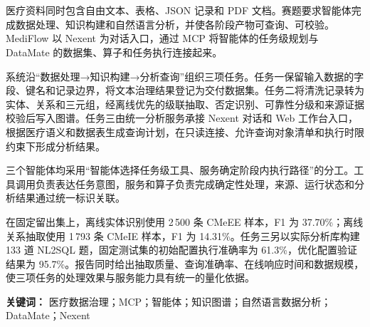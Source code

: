 \chapter*{}

医疗资料同时包含自由文本、表格、JSON 记录和 PDF 文档。赛题要求智能体完成数据处理、知识构建和自然语言分析，并使各阶段产物可查询、可校验。MediFlow 以 Nexent 为对话入口，通过 MCP 将智能体的任务级规划与 DataMate 的数据集、算子和任务执行连接起来。

系统沿“数据处理→知识构建→分析查询”组织三项任务。任务一保留输入数据的字段、键名和记录边界，将文本治理结果登记为交付数据集。任务二将清洗记录转为实体、关系和三元组，经离线优先的级联抽取、否定识别、可靠性分级和来源证据校验后写入图谱。任务三由统一分析服务承接 Nexent 对话和 Web 工作台入口，根据医疗语义和数据表生成查询计划，在只读连接、允许查询对象清单和执行时限约束下形成分析结果。

三个智能体均采用“智能体选择任务级工具、服务确定阶段内执行路径”的分工。工具调用负责表达任务意图，服务和算子负责完成确定性处理，来源、运行状态和分析结果通过统一标识关联。

在固定留出集上，离线实体识别使用 2\,500 条 CMeEE 样本，F1 为 37.70\%；离线关系抽取使用 1\,793 条 CMeIE 样本，F1 为 14.31\%。任务三另以实际分析库构建 133 道 NL2SQL 题，固定测试集的初始配置执行准确率为 61.3\%，优化配置验证结果为 95.7\%。报告同时给出抽取质量、查询准确率、在线响应时间和数据规模，使三项任务的处理效果与服务能力具有统一的量化依据。

\vspace{0.7em}
\noindent\textbf{关键词：}
医疗数据治理；MCP；智能体；知识图谱；自然语言数据分析；DataMate；Nexent

\clearpage
